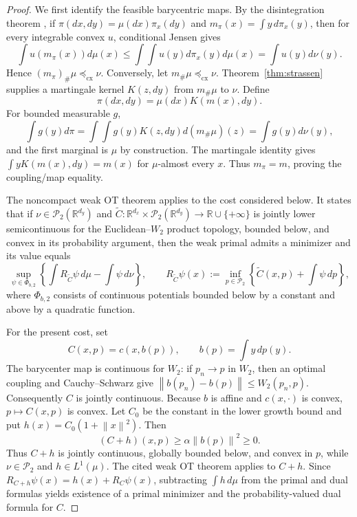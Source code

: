 \documentclass[11pt]{article}
\newcommand{\R}{\mathbb R}
\newcommand{\cP}{\mathcal P}
\newcommand{\norm}[1]{\left\lVert #1\right\rVert}
\newcommand{\cx}{\preceq_{\mathrm{cx}}}
\theoremstyle{plain}
\theoremstyle{definition}
\theoremstyle{remark}
\begin{document}
\begin{proof}
We first identify the feasible barycentric maps.  By the disintegration theorem
\cite[Theorem~3.4]{Kallenberg}, if
$\pi(dx,dy)=\mu(dx)\pi_x(dy)$ and $m_\pi(x)=\int y\,d\pi_x(y)$, then for every
integrable convex $u$, conditional Jensen gives
\[
 \int u(m_\pi(x))d\mu(x)
 \le\int\!\int u(y)d\pi_x(y)d\mu(x)=\int u(y)d\nu(y).
\]
Hence $(m_\pi)_\#\mu\cx\nu$.  Conversely, let $m_\#\mu\cx\nu$.
Theorem~\ref{thm:strassen} supplies a martingale kernel $K(z,dy)$ from
$m_\#\mu$ to $\nu$.  Define
\[
 \pi(dx,dy)=\mu(dx)K(m(x),dy).
\]
For bounded measurable $g$,
\[
 \int g(y)d\pi=\int\!\int g(y)K(z,dy)d(m_\#\mu)(z)=\int g(y)d\nu(y),
\]
and the first marginal is $\mu$ by construction.  The martingale identity gives
$\int yK(m(x),dy)=m(x)$ for $\mu$-almost every $x$.  Thus $m_\pi=m$, proving
the coupling/map equality.

The noncompact weak OT theorem
\cite[Theorems~2.9 and~3.1]{BBP} applies to the cost considered below.  It states
that if
$\nu\in\cP_2(\R^{d_y})$ and
$\widetilde C:\R^{d_x}\times\cP_2(\R^{d_y})\to\R\cup\{+\infty\}$ is jointly
lower semicontinuous for the Euclidean--$W_2$ product topology, bounded below, and
convex in its probability argument, then the weak primal admits a minimizer and
its value equals
\[
 \sup_{\psi\in\Phi_{b,2}}
 \left\{\int R_{\widetilde C}\psi\,d\mu-\int\psi\,d\nu\right\},
 \qquad
 R_{\widetilde C}\psi(x)
 :=\inf_{p\in\cP_2}\left\{\widetilde C(x,p)+\int\psi\,dp\right\},
\]
where $\Phi_{b,2}$ consists of continuous potentials bounded below by a constant
and above by a quadratic function.

For the present cost, set
\[
 C(x,p)=c(x,b(p)),\qquad b(p)=\int y\,dp(y).
\]
The barycenter map is continuous for $W_2$: if $p_n\to p$ in $W_2$, then an
optimal coupling and Cauchy--Schwarz give
$\norm{b(p_n)-b(p)}\le W_2(p_n,p)$.  Consequently $C$ is jointly continuous.
Because $b$ is affine and $c(x,\cdot)$ is convex, $p\mapsto C(x,p)$ is convex.
Let $C_0$ be the constant in the lower growth bound and put
$h(x)=C_0(1+\norm x^2)$.  Then
\[
 (C+h)(x,p)\ge\alpha\norm{b(p)}^2\ge0.
\]
Thus $C+h$ is jointly continuous, globally bounded below, and convex in $p$, while
$\nu\in\cP_2$ and $h\in L^1(\mu)$.  The cited weak OT theorem applies to
$C+h$.  Since $R_{C+h}\psi(x)=h(x)+R_C\psi(x)$, subtracting $\int h\,d\mu$ from
the primal and dual formulas yields existence of a primal minimizer and the probability-valued
dual formula for $C$.


\end{proof}
\end{document}
